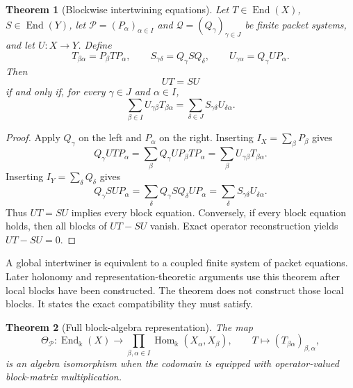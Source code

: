 \documentclass[11pt]{article}
\newtheorem{theorem}{Theorem}[section]
\theoremstyle{definition}
\theoremstyle{remark}
\theoremstyle{definition}\newtheorem{example}[theorem]{Example}
\newcommand{\bbk}{\Bbbk}
\newcommand{\Pcal}{\mathcal P}
\newcommand{\Qcal}{\mathcal Q}
\newcommand{\End}{\operatorname{End}}
\newcommand{\Hom}{\operatorname{Hom}}
\newcommand{\RecordID}[1]{\label{record:#1}}
\newcommand{\Depends}[1]{}
\newcommand{\Exports}[1]{}
\begin{document}
\begin{theorem}[Blockwise intertwining equations]
\label{thm:block-intertwining}
Let \(T\in\End(X)\), \(S\in\End(Y)\), let \(\Pcal=(P_\alpha)_{\alpha\in I}\) and \(\Qcal=(Q_\gamma)_{\gamma\in J}\) be finite packet systems, and let \(U:X\to Y\).  Define
\[
T_{\beta\alpha}=P_\beta TP_\alpha,
\qquad
S_{\gamma\delta}=Q_\gamma SQ_\delta,
\qquad
U_{\gamma\alpha}=Q_\gamma UP_\alpha.
\]
Then
\[
\boxed{UT=SU}
\]
if and only if, for every \(\gamma\in J\) and \(\alpha\in I\),
\[
\boxed{
\sum_{\beta\in I}U_{\gamma\beta}T_{\beta\alpha}
=
\sum_{\delta\in J}S_{\gamma\delta}U_{\delta\alpha}.
}
\]
\end{theorem}
\RecordID{PSC-I-T-BLOCK-INTERTWINING}
\Depends{PSC-I-T-OPERATOR-RECONSTRUCTION and PSC-I-T-BLOCK-MULTIPLICATION.}
\Exports{Packetwise equivalence, gluing, symmetry, and local representation comparison.}

\begin{proof}
Apply \(Q_\gamma\) on the left and \(P_\alpha\) on the right.  Inserting \(I_X=\sum_\beta P_\beta\) gives
\[
Q_\gamma UTP_\alpha
=
\sum_\beta Q_\gamma UP_\beta TP_\alpha
=
\sum_\beta U_{\gamma\beta}T_{\beta\alpha}.
\]
Inserting \(I_Y=\sum_\delta Q_\delta\) gives
\[
Q_\gamma SUP_\alpha
=
\sum_\delta Q_\gamma SQ_\delta UP_\alpha
=
\sum_\delta S_{\gamma\delta}U_{\delta\alpha}.
\]
Thus \(UT=SU\) implies every block equation.  Conversely, if every block equation holds, then all blocks of \(UT-SU\) vanish.  Exact operator reconstruction yields \(UT-SU=0\).
\end{proof}

\begin{interpretation}
A global intertwiner is equivalent to a coupled finite system of packet equations.  Later holonomy and representation-theoretic arguments use this theorem after local blocks have been constructed.  The theorem does not construct those local blocks.  It states the exact compatibility they must satisfy.
\end{interpretation}


\begin{theorem}[Full block-algebra representation]
\label{thm:block-algebra}
The map
\[
\Theta_{\Pcal}:\End_{\bbk}(X)
\longrightarrow
\prod_{\beta,\alpha\in I}\Hom_{\bbk}(X_\alpha,X_\beta),
\qquad
T\longmapsto(T_{\beta\alpha})_{\beta,\alpha},
\]
is an algebra isomorphism when the codomain is equipped with operator-valued block-matrix multiplication.
\end{theorem}
\RecordID{PSC-I-T-BLOCK-ALGEBRA}
\Depends{\nolinkurl{PSC-I-T-OPERATOR-RECONSTRUCTION} and
\nolinkurl{PSC-I-T-BLOCK-MULTIPLICATION}.}
\end{document}
